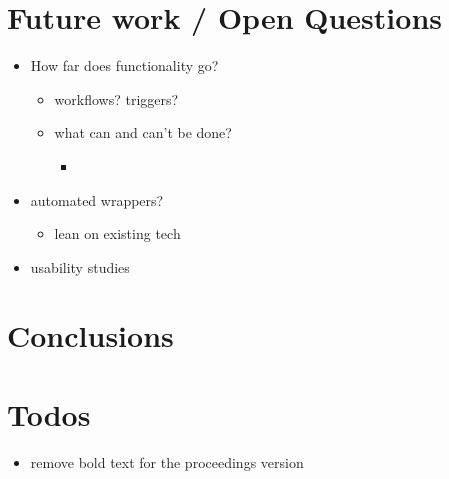 \documentclass[english,submission]{programming}
\providecommand{\tightlist}{%
  \setlength{\itemsep}{0pt}\setlength{\parskip}{0pt}}
\begin{document}
\hypertarget{future-work-open-questions}{%
\section{Future work / Open
Questions}\label{future-work-open-questions}}

\begin{itemize}
\tightlist
\item
  How far does functionality go?

  \begin{itemize}
  \tightlist
  \item
    workflows? triggers?
  \item
    what can and can't be done?

    \begin{itemize}
    \tightlist
    \item
    \end{itemize}
  \end{itemize}
\item
  automated wrappers?

  \begin{itemize}
  \tightlist
  \item
    lean on existing tech
  \end{itemize}
\item
  usability studies
\end{itemize}

\hypertarget{conclusions}{%
\section{Conclusions}\label{conclusions}}

\hypertarget{todos}{%
\section{Todos}\label{todos}}

\begin{itemize}
\tightlist
\item
  remove bold text for the proceedings version
\end{itemize}

\acks
\printbibliography
\end{document}

